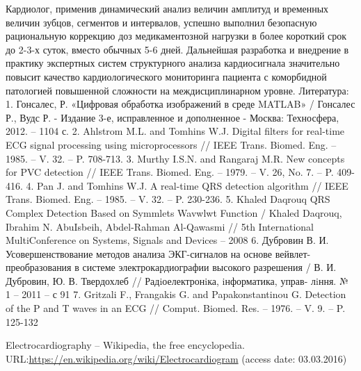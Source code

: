 \documentclass[runningheads]{AIIT}
\begin{document}
 Кардиолог, применив динамический анализ величин амплитуд и временных величин зубцов, сегментов и интервалов,  успешно выполнил безопасную рациональную коррекцию доз медикаментозной нагрузки в более короткий срок до 2-3-х суток, вместо обычных 5-6 дней.
Дальнейшая разработка и внедрение в практику экспертных систем структурного анализа кардиосигнала значительно повысит качество кардиологического мониторинга пациента с коморбидной патологией повышенной сложности на междисциплинарном уровне.
Литература:
1.	Гонсалес, Р. «Цифровая обработка изображений в среде MATLAB» / Гонсалес Р., Вудс Р. - Издание 3-е, исправленное и дополненное - Москва: Техносфера, 2012. – 1104 с.
2.	Ahlstrom M.L. and Tomhins W.J. Digital filters for real-time ECG signal processing using microprocessors // IEEE Trans. Biomed. Eng. – 1985. – V. 32. – P. 708-713.
3.	Murthy I.S.N. and Rangaraj M.R. New concepts for PVC detection // IEEE Trans. Biomed. Eng. – 1979. – V. 26, No. 7. – P. 409-416.
4.	Pan J. and Tomhins W.J. A real-time QRS detection algorithm // IEEE Trans. Biomed. Eng. – 1985. – V. 32. – P. 230-236.
5.	Khaled Daqrouq QRS Complex Detection Based on Symmlets Wavwlwt Function / Khaled Daqrouq, Ibrahim N. AbuIsbeih, Abdel-Rahman Al-Qawasmi // 5th International MultiConference on Systems, Signals and Devices – 2008
6.	Дубровин В. И. Усовершенствование методов анализа ЭКГ-сигналов на основе вейвлет-преобразования в системе электрокардиографии высокого разрешения / В. И. Дубровин, Ю. В. Твердохлеб // Радiоелектронiка, iнформатика, управ- лiння. № 1 – 2011 – с 91
7.	Gritzali F., Frangakis G. and Papakonstantinou G. Detection of the P and T waves in an ECG // Comput. Biomed. Res. – 1976. – V. 9. – P. 125-132

%
%
 \begin{thebibliography}{99}
  Electrocardiography -- Wikipedia, the free encyclopedia. URL:\url{https://en.wikipedia.org/wiki/Electrocardiogram} (access date: 03.03.2016)
 \end{thebibliography}


%
%

\end{document}
